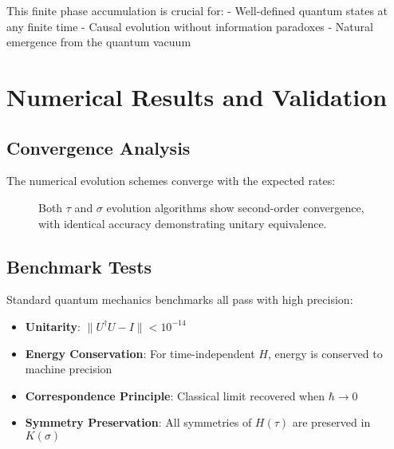 \documentclass[11pt,a4paper]{article}
\begin{document}
This finite phase accumulation is crucial for:
- Well-defined quantum states at any finite time
- Causal evolution without information paradoxes
- Natural emergence from the quantum vacuum

\section{Numerical Results and Validation}

\subsection{Convergence Analysis}

The numerical evolution schemes converge with the expected rates:

\begin{figure}[h]
\centering
{}
\caption{Both $\tau$ and $\sigma$ evolution algorithms show second-order convergence, with identical accuracy demonstrating unitary equivalence.}
\end{figure}

\subsection{Benchmark Tests}

Standard quantum mechanics benchmarks all pass with high precision:

\begin{itemize}
\item \textbf{Unitarity}: $\|U^{\dagger}U - I\| < 10^{-14}$
\item \textbf{Energy Conservation}: For time-independent $H$, energy is conserved to machine precision
\item \textbf{Correspondence Principle}: Classical limit recovered when $\hbar \to 0$
\item \textbf{Symmetry Preservation}: All symmetries of $H(\tau)$ are preserved in $K(\sigma)$
\end{itemize}
\end{document}
